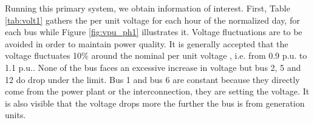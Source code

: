
Running this primary system, we obtain information of interest. First, Table \ref{tab:volt1} gathers the per unit voltage for each hour of the normalized day, for each bus while Figure \ref{fig:vpu_ph1} illustrates it. Voltage fluctuations are to be avoided in order to maintain power quality. It is generally accepted that the voltage fluctuates 10\% around the nominal per unit voltage \cite{tsili2009review}, i.e. from 0.9 p.u. to 1.1 p.u.. None of the bus faces an excessive increase in voltage but bus 2, 5 and 12 do drop under the limit. Bus 1 and bus 6 are constant because they directly come from the power plant or the interconnection, they are setting the voltage. It is also visible that the voltage drops more the further the bus is from generation units. 

